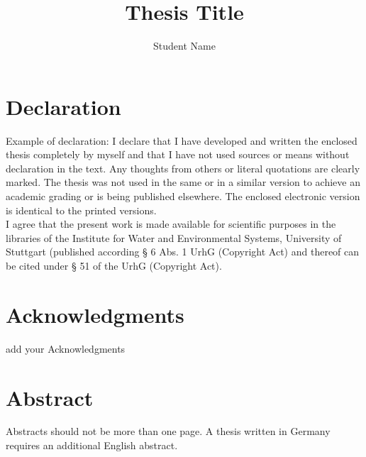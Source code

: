 \documentclass[11pt,twoside]{report}
\title{\textbf{Thesis Title}} %
\author{Student Name} %
\begin{document}


\newpage\null\thispagestyle{empty}\newpage


\chapter*{Declaration}
{
	Example of declaration:
	I declare that I have developed and written the enclosed thesis completely by myself and that I have not used sources or means without declaration in the text. Any thoughts from others or literal quotations are clearly marked. The thesis was not used in the same or in a similar version to achieve an academic grading or is being published elsewhere. The enclosed electronic version is identical to the printed versions.\\
	
	I agree that the present work is made available for scientific purposes in the libraries of the Institute for Water and Environmental Systems, University of Stuttgart (published according § 6 Abs. 1 UrhG (Copyright Act) and thereof can be cited under § 51 of the UrhG (Copyright Act).
}

\chapter*{Acknowledgments}
{
add your Acknowledgments
}

\chapter*{Abstract}
{
Abstracts should not be more than one page. A thesis written in Germany requires an additional English abstract. 
}

\tableofcontents
\clearpage

\listoffigures
{}

\listoftables
{}

\pagestyle{fancy}
\fancyhf{}
\fancyhead[LE,RO]{\nouppercase{\leftmark}}
\fancyhead[RE,LO]{\nouppercase{\rightmark}}
\fancyfoot[LE,RO]{\thepage}
\renewcommand{\headrulewidth}{1.0pt}


\cleardoublepage


	


\end{document}
